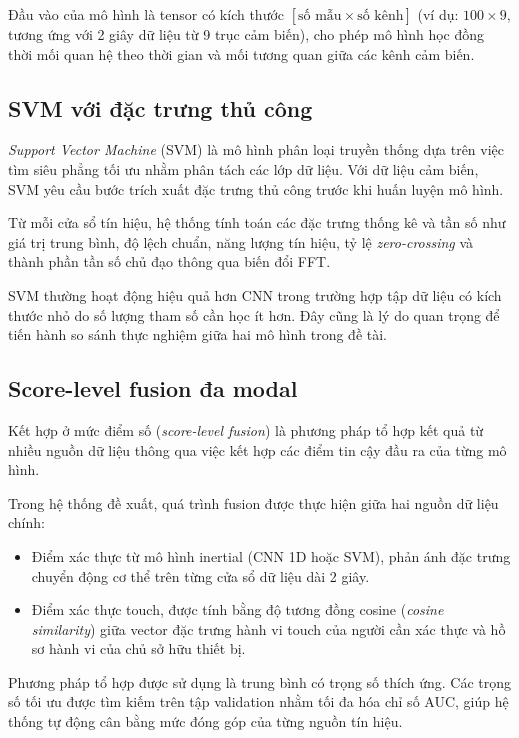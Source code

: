 \documentclass[../DoAn.tex]{subfiles}
\begin{document}
    Đầu vào của mô hình là tensor có kích thước $[\text{số mẫu} \times \text{số kênh}]$ (ví dụ: $100 \times 9$, tương ứng với 2 giây dữ liệu từ 9 trục cảm biến), cho phép mô hình học đồng thời mối quan hệ theo thời gian và mối tương quan giữa các kênh cảm biến.
    
    \subsection{SVM với đặc trưng thủ công}
    
    \textit{Support Vector Machine} (SVM) là mô hình phân loại truyền thống dựa trên việc tìm siêu phẳng tối ưu nhằm phân tách các lớp dữ liệu. Với dữ liệu cảm biến, SVM yêu cầu bước trích xuất đặc trưng thủ công trước khi huấn luyện mô hình.
    
    Từ mỗi cửa sổ tín hiệu, hệ thống tính toán các đặc trưng thống kê và tần số như giá trị trung bình, độ lệch chuẩn, năng lượng tín hiệu, tỷ lệ \textit{zero-crossing} và thành phần tần số chủ đạo thông qua biến đổi FFT.
    
    SVM thường hoạt động hiệu quả hơn CNN trong trường hợp tập dữ liệu có kích thước nhỏ do số lượng tham số cần học ít hơn. Đây cũng là lý do quan trọng để tiến hành so sánh thực nghiệm giữa hai mô hình trong đề tài.
    
    \subsection{Score-level fusion đa modal}
    
    Kết hợp ở mức điểm số (\textit{score-level fusion}) là phương pháp tổ hợp kết quả từ nhiều nguồn dữ liệu thông qua việc kết hợp các điểm tin cậy đầu ra của từng mô hình.
    
    Trong hệ thống đề xuất, quá trình fusion được thực hiện giữa hai nguồn dữ liệu chính:
    \begin{itemize}
        \item Điểm xác thực từ mô hình inertial (CNN 1D hoặc SVM), phản ánh đặc trưng chuyển động cơ thể trên từng cửa sổ dữ liệu dài 2 giây.
        
        \item Điểm xác thực touch, được tính bằng độ tương đồng cosine (\textit{cosine similarity}) giữa vector đặc trưng hành vi touch của người cần xác thực và hồ sơ hành vi của chủ sở hữu thiết bị.
    \end{itemize}
    
    Phương pháp tổ hợp được sử dụng là trung bình có trọng số thích ứng. Các trọng số tối ưu được tìm kiếm trên tập validation nhằm tối đa hóa chỉ số AUC, giúp hệ thống tự động cân bằng mức đóng góp của từng nguồn tín hiệu.
\end{document}
